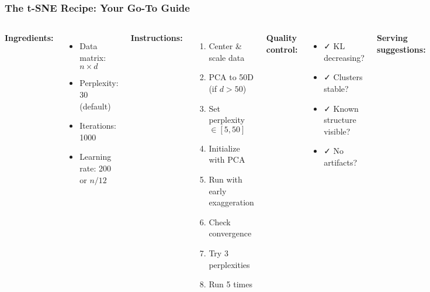 \documentclass[aspectratio=169]{beamer}
\begin{document}
\begin{frame}
\frametitle{The t-SNE Recipe: Your Go-To Guide}
\begin{columns}[T]
\textbf{Ingredients:}
\begin{itemize}
\small
\item Data matrix: $n \times d$
\item Perplexity: 30 (default)
\item Iterations: 1000
\item Learning rate: 200 or $n/12$
\end{itemize}

\vspace{0.3cm}
\textbf{Instructions:}
\begin{enumerate}
\small
\item Center \& scale data
\item PCA to 50D (if $d > 50$)
\item Set perplexity $\in [5, 50]$
\item Initialize with PCA
\item Run with early exaggeration
\item Check convergence
\item Try 3 perplexities
\item Run 5 times
\end{enumerate}

\textbf{Quality control:}
\begin{itemize}
\small
\item ✓ KL decreasing?
\item ✓ Clusters stable?
\item ✓ Known structure visible?
\item ✓ No artifacts?
\end{itemize}

\vspace{0.3cm}
\textbf{Serving suggestions:}
\begin{itemize}
\small
\item Color by known labels
\item Interactive plot (plotly)
\item Compare with PCA
\item Validate with clustering
\end{itemize}

\vspace{0.3cm}
\textbf{Warning:}\\
\small Never trust distances!\\
Always run multiple times!
\end{columns}
\end{frame}
\end{document}
